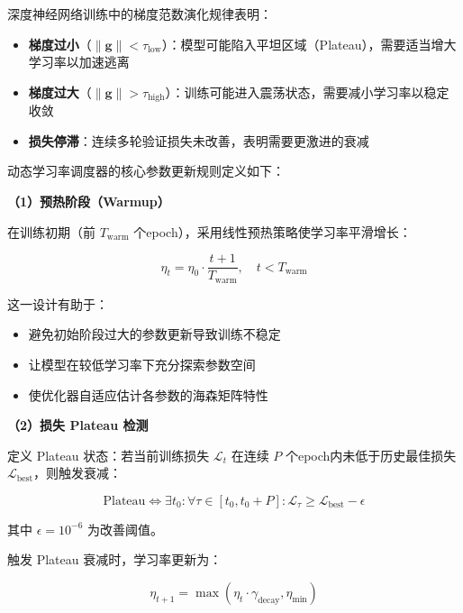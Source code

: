 \documentclass[UTF8, a4paper, 12pt]{article}
\begin{document}
深度神经网络训练中的梯度范数演化规律表明：

\begin{itemize}
    \item \textbf{梯度过小}（$\|\mathbf{g}\| < \tau_{\text{low}}$）：模型可能陷入平坦区域（Plateau），需要适当增大学习率以加速逃离
    \item \textbf{梯度过大}（$\|\mathbf{g}\| > \tau_{\text{high}}$）：训练可能进入震荡状态，需要减小学习率以稳定收敛
    \item \textbf{损失停滞}：连续多轮验证损失未改善，表明需要更激进的衰减
\end{itemize}


动态学习率调度器的核心参数更新规则定义如下：

\textbf{（1）预热阶段（Warmup）}

在训练初期（前 $T_{\text{warm}}$ 个epoch），采用线性预热策略使学习率平滑增长：

\begin{equation}
\eta_t = \eta_0 \cdot \frac{t + 1}{T_{\text{warm}}}, \quad t < T_{\text{warm}}
\end{equation}

这一设计有助于：
\begin{itemize}
    \item 避免初始阶段过大的参数更新导致训练不稳定
    \item 让模型在较低学习率下充分探索参数空间
    \item 使优化器自适应估计各参数的海森矩阵特性
\end{itemize}

\textbf{（2）损失 Plateau 检测}

定义 Plateau 状态：若当前训练损失 $\mathcal{L}_t$ 在连续 $P$ 个epoch内未低于历史最佳损失 $\mathcal{L}_{\text{best}}$，则触发衰减：

\begin{equation}
\text{Plateau} \iff \exists t_0: \forall \tau \in [t_0, t_0 + P]: \mathcal{L}_\tau \geq \mathcal{L}_{\text{best}} - \epsilon
\end{equation}

其中 $\epsilon = 10^{-6}$ 为改善阈值。

触发 Plateau 衰减时，学习率更新为：

\begin{equation}
\eta_{t+1} = \max\left(\eta_t \cdot \gamma_{\text{decay}}, \eta_{\text{min}}\right)
\end{equation}
\end{document}
